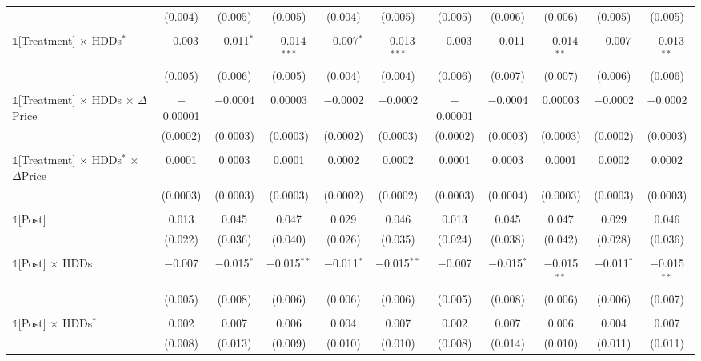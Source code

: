 \begin{table}[!htbp]
\begin{longtable}{@{\extracolsep{0pt}}lcccccccccc}
  & (0.004) & (0.005) & (0.005) & (0.004) & (0.005) & (0.005) & (0.006) & (0.006) & (0.005) & (0.005) \\ 
  & & & & & & & & & & \\ 
 $\mathbb{1}$[Treatment] $\times$ HDDs$^{*}$ & $-$0.003 & $-$0.011$^{*}$ & $-$0.014$^{***}$ & $-$0.007$^{*}$ & $-$0.013$^{***}$ & $-$0.003 & $-$0.011 & $-$0.014$^{**}$ & $-$0.007 & $-$0.013$^{**}$ \\ 
  & (0.005) & (0.006) & (0.005) & (0.004) & (0.004) & (0.006) & (0.007) & (0.007) & (0.006) & (0.006) \\ 
  & & & & & & & & & & \\ 
 $\mathbb{1}$[Treatment] $\times$ HDDs $\times$ $\Delta$Price & $-$0.00001 & $-$0.0004 & 0.00003 & $-$0.0002 & $-$0.0002 & $-$0.00001 & $-$0.0004 & 0.00003 & $-$0.0002 & $-$0.0002 \\ 
  & (0.0002) & (0.0003) & (0.0003) & (0.0002) & (0.0003) & (0.0002) & (0.0003) & (0.0003) & (0.0002) & (0.0003) \\ 
  & & & & & & & & & & \\ 
 $\mathbb{1}$[Treatment] $\times$ HDDs$^{*}$ $\times$ $\Delta$Price & 0.0001 & 0.0003 & 0.0001 & 0.0002 & 0.0002 & 0.0001 & 0.0003 & 0.0001 & 0.0002 & 0.0002 \\ 
  & (0.0003) & (0.0003) & (0.0003) & (0.0002) & (0.0002) & (0.0003) & (0.0004) & (0.0003) & (0.0003) & (0.0003) \\ 
  & & & & & & & & & & \\ 
 $\mathbb{1}$[Post] & 0.013 & 0.045 & 0.047 & 0.029 & 0.046 & 0.013 & 0.045 & 0.047 & 0.029 & 0.046 \\ 
  & (0.022) & (0.036) & (0.040) & (0.026) & (0.035) & (0.024) & (0.038) & (0.042) & (0.028) & (0.036) \\ 
  & & & & & & & & & & \\ 
 $\mathbb{1}$[Post] $\times$ HDDs & $-$0.007 & $-$0.015$^{*}$ & $-$0.015$^{**}$ & $-$0.011$^{*}$ & $-$0.015$^{**}$ & $-$0.007 & $-$0.015$^{*}$ & $-$0.015$^{**}$ & $-$0.011$^{*}$ & $-$0.015$^{**}$ \\ 
  & (0.005) & (0.008) & (0.006) & (0.006) & (0.006) & (0.005) & (0.008) & (0.006) & (0.006) & (0.007) \\ 
  & & & & & & & & & & \\ 
 $\mathbb{1}$[Post] $\times$ HDDs$^{*}$ & 0.002 & 0.007 & 0.006 & 0.004 & 0.007 & 0.002 & 0.007 & 0.006 & 0.004 & 0.007 \\ 
  & (0.008) & (0.013) & (0.009) & (0.010) & (0.010) & (0.008) & (0.014) & (0.010) & (0.011) & (0.011) \\ 

\end{longtable}
\end{table}
